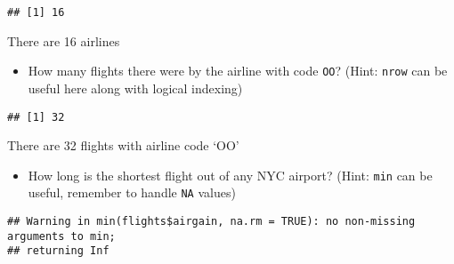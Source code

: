 \documentclass[
]{article}
\newenvironment{Shaded}{\begin{snugshade}}{\end{snugshade}}
\newcommand{\DataTypeTok}[1]{\textcolor[rgb]{0.13,0.29,0.53}{#1}}
\newcommand{\KeywordTok}[1]{\textcolor[rgb]{0.13,0.29,0.53}{\textbf{#1}}}
\newcommand{\NormalTok}[1]{#1}
\newcommand{\OperatorTok}[1]{\textcolor[rgb]{0.81,0.36,0.00}{\textbf{#1}}}
\newcommand{\OtherTok}[1]{\textcolor[rgb]{0.56,0.35,0.01}{#1}}
\newcommand{\StringTok}[1]{\textcolor[rgb]{0.31,0.60,0.02}{#1}}
\providecommand{\tightlist}{%
  \setlength{\itemsep}{0pt}\setlength{\parskip}{0pt}}
\begin{document}
\begin{Shaded}
\end{Shaded}

\begin{verbatim}
## [1] 16
\end{verbatim}

There are 16 airlines

\begin{itemize}
\tightlist
\item
  How many flights there were by the airline with code \texttt{OO}?
  (Hint: \texttt{nrow} can be useful here along with logical indexing)
\end{itemize}

\begin{Shaded}
\end{Shaded}

\begin{verbatim}
## [1] 32
\end{verbatim}

There are 32 flights with airline code `OO'

\begin{itemize}
\tightlist
\item
  How long is the shortest flight out of any NYC airport? (Hint:
  \texttt{min} can be useful, remember to handle \texttt{NA} values)
\end{itemize}

\begin{Shaded}
\end{Shaded}

\begin{verbatim}
## Warning in min(flights$airgain, na.rm = TRUE): no non-missing arguments to min;
## returning Inf
\end{verbatim}
\end{document}
